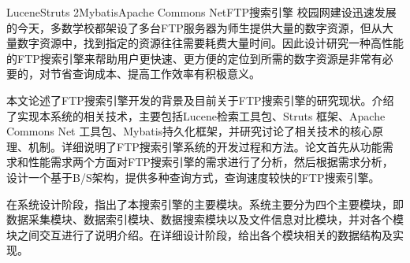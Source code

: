 
\begin{Cabstract}{Lucene}{Struts 2}{Mybatis}{Apache Commons Net}{FTP搜索引擎}
校园网建设迅速发展的今天，多数学校都架设了多台FTP服务器为师生提供大量的数字资源，但从大量数字资源中，找到指定的资源往往需要耗费大量时间。因此设计研究一种高性能的FTP搜索引擎来帮助用户更快速、更方便的定位到所需的数字资源是非常有必要的，对节省查询成本、提高工作效率有积极意义。

本文论述了FTP搜索引擎开发的背景及目前关于FTP搜索引擎的研究现状。介绍了实现本系统的相关技术，主要包括Lucene检索工具包、Struts 框架、Apache Commons Net 工具包、Mybatis持久化框架，并研究讨论了相关技术的核心原理、机制。详细说明了FTP搜索引擎系统的开发过程和方法。论文首先从功能需求和性能需求两个方面对FTP搜索引擎的需求进行了分析，然后根据需求分析，设计一个基于B/S架构，提供多种查询方式，查询速度较快的FTP搜索引擎。

在系统设计阶段，指出了本搜索引擎的主要模块。系统主要分为四个主要模块，即数据采集模块、数据索引模块、数据搜索模块以及文件信息对比模块，并对各个模块之间交互进行了说明介绍。在详细设计阶段，给出各个模块相关的数据结构及实现。
\end{Cabstract}
